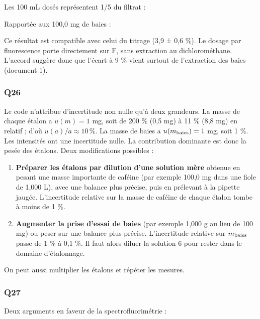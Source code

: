 \documentclass[11pt,a4paper]{article}
\providecommand{\tightlist}{\setlength{\itemsep}{0pt}\setlength{\parskip}{0pt}}
\newcommand{\equationajustee}[1]{%
  \sbox{\boiteequation}{$\displaystyle #1$}%
  \ifdim\wd\boiteequation>\linewidth
    \[\resizebox{\linewidth}{!}{\usebox{\boiteequation}}\]%
  \else
    \[#1\]%
  \fi}
\begin{document}
Les 100 mL dosés représentent 1/5 du filtrat :

\equationajustee{m_{\rm totale} = 5\times0{,}752 = 3{,}76\ \mathrm{mg}}

Rapportée aux 100,0 mg de baies :

\equationajustee{\boxed{w = 3{,}8\ \%\ \text{en masse}}}

Ce résultat est compatible avec celui du titrage (3,9 ± 0,6 \%). Le dosage par fluorescence porte directement sur F, sans extraction au dichlorométhane. L'accord suggère donc que l'écart à 9 \% vient surtout de l'extraction des baies (document 1).

\hypertarget{q26}{%
\subsubsection{Q26}\label{q26}}

Le code n'attribue d'incertitude non nulle qu'à deux grandeurs. La masse de chaque étalon a \(u(m) = 1\) mg, soit de 200 \% (0,5 mg) à 11 \% (8,8 mg) en relatif ; d'où \(u(a)/a \approx 10\,\%\). La masse de baies a \(u(m_{\rm baies}) = 1\) mg, soit 1 \%. Les intensités ont une incertitude nulle. La contribution dominante est donc la pesée des étalons. Deux modifications possibles :

\begin{enumerate}
\def\labelenumi{\arabic{enumi}.}
\tightlist
\item
  \textbf{Préparer les étalons par dilution d'une solution mère} obtenue en pesant une masse importante de caféine (par exemple 100,0 mg dans une fiole de 1,000 L), avec une balance plus précise, puis en prélevant à la pipette jaugée. L'incertitude relative sur la masse de caféine de chaque étalon tombe à moins de 1 \%.
\item
  \textbf{Augmenter la prise d'essai de baies} (par exemple 1,000 g au lieu de 100 mg) ou peser sur une balance plus précise. L'incertitude relative sur \(m_{\rm baies}\) passe de 1 \% à 0,1 \%. Il faut alors diluer la solution 6 pour rester dans le domaine d'étalonnage.
\end{enumerate}

On peut aussi multiplier les étalons et répéter les mesures.

\hypertarget{q27}{%
\subsubsection{Q27}\label{q27}}

Deux arguments en faveur de la spectrofluorimétrie :
\end{document}
